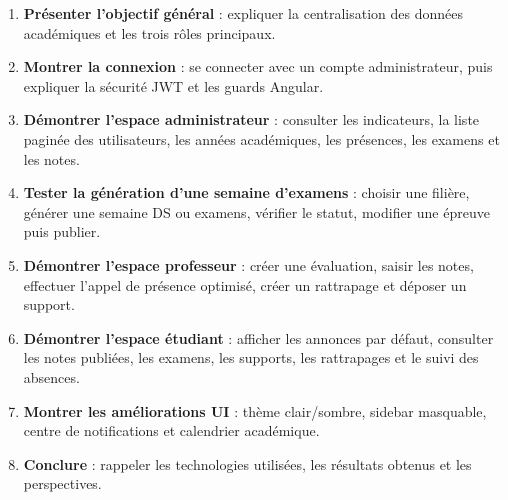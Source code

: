 \documentclass[12pt,a4paper]{report}
\begin{document}
\begin{enumerate}[itemsep=0.5em]
    \item \textbf{Présenter l'objectif général} : expliquer la centralisation des données académiques et les trois rôles principaux.
    \item \textbf{Montrer la connexion} : se connecter avec un compte administrateur, puis expliquer la sécurité JWT et les guards Angular.
    \item \textbf{Démontrer l'espace administrateur} : consulter les indicateurs, la liste paginée des utilisateurs, les années académiques, les présences, les examens et les notes.
    \item \textbf{Tester la génération d'une semaine d'examens} : choisir une filière, générer une semaine DS ou examens, vérifier le statut, modifier une épreuve puis publier.
    \item \textbf{Démontrer l'espace professeur} : créer une évaluation, saisir les notes, effectuer l'appel de présence optimisé, créer un rattrapage et déposer un support.
    \item \textbf{Démontrer l'espace étudiant} : afficher les annonces par défaut, consulter les notes publiées, les examens, les supports, les rattrapages et le suivi des absences.
    \item \textbf{Montrer les améliorations UI} : thème clair/sombre, sidebar masquable, centre de notifications et calendrier académique.
    \item \textbf{Conclure} : rappeler les technologies utilisées, les résultats obtenus et les perspectives.
\end{enumerate}
\end{document}
